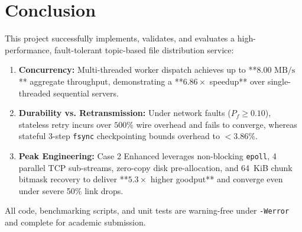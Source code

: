 \documentclass[11pt,a4paper]{article}
\begin{document}
\section{Conclusion}

This project successfully implements, validates, and evaluates a high-performance, fault-tolerant topic-based file distribution service:
\begin{enumerate}[leftmargin=*]
    \item \textbf{Concurrency:} Multi-threaded worker dispatch achieves up to **$8.00\text{ MB/s}$** aggregate throughput, demonstrating a **$6.86\times$ speedup** over single-threaded sequential servers.
    \item \textbf{Durability vs. Retransmission:} Under network faults ($P_f \ge 0.10$), stateless retry incurs over $500\%$ wire overhead and fails to converge, whereas stateful 3-step \texttt{fsync} checkpointing bounds overhead to $<3.86\%$.
    \item \textbf{Peak Engineering:} Case 2 Enhanced leverages non-blocking \texttt{epoll}, 4 parallel TCP sub-streams, zero-copy disk pre-allocation, and 64~KiB chunk bitmask recovery to deliver **$5.3\times$ higher goodput** and converge even under severe 50\% link drops.
\end{enumerate}

All code, benchmarking scripts, and unit tests are warning-free under \texttt{-Werror} and complete for academic submission.
\end{document}
